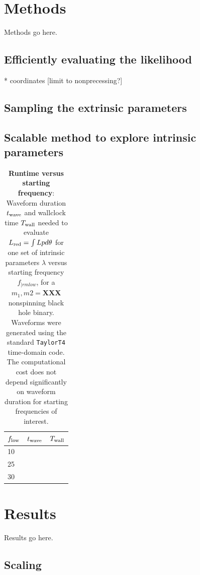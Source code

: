 \documentclass[twocolumn,prd,nofootinbib]{revtex4}
\begin{document}
\section{Methods}

Methods go here.

\subsection{Efficiently evaluating the likelihood}

* coordinates [limit to nonprecessing?]

\subsection{Sampling the extrinsic parameters}

\subsection{Scalable method to explore intrinsic parameters }

\begin{table}
\begin{tabular}{lll}
$f_{\rm low}$ & $t_{\rm wave}$ & $T_{\rm wall}$ \\\hline
10 & & \\
25 & & \\
30 & & \\
\end{tabular}
\caption{\textbf{Runtime versus starting frequency}: Waveform duration $t_{\rm wave}$ and wallclock time $T_{\rm wall}$  needed to evaluate $L_{\rm red}=\int L p d\theta$
  for one set of intrinsic parameters $\lambda$ versus starting frequency $f_{|rm low}$, for a $m_1,m2=\textbf{XXX}$
  nonspinning black hole binary.  Waveforms were generated using the standard \texttt{TaylorT4} time-domain code.  The
  computational cost does not depend significantly on waveform duration for starting frequencies of interest. 
}
\end{table}


\section{Results}

Results go here.

\subsection{Scaling}
\end{document}
